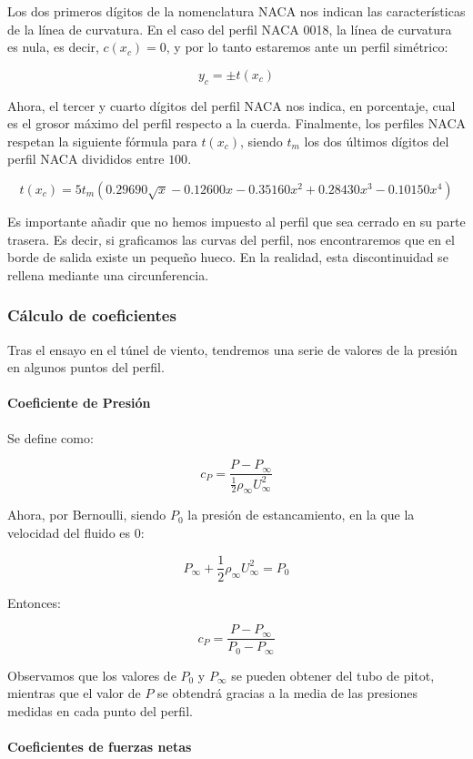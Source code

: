\documentclass{article}
\begin{document}
Los dos primeros dígitos de la nomenclatura NACA nos indican las características de la línea de curvatura. En el caso del perfil
NACA 0018, la línea de curvatura es nula, es decir, $c(x_c) = 0$, y por lo tanto estaremos ante un perfil simétrico:

$$y_c = \pm t(x_c)$$

Ahora, el tercer y cuarto dígitos del perfil NACA nos indica, en porcentaje, cual es el grosor máximo del perfil respecto
a la cuerda. Finalmente, los perfiles NACA respetan la siguiente fórmula para $t(x_c)$, siendo $t_m$ los
dos últimos dígitos del perfil NACA divididos entre $100$.

$$t(x_c) = 5 t_m (0.29690 \sqrt{x} - 0.12600 x - 0.35160 x^2 + 0.28430 x^3 - 0.10150 x^4)$$

Es importante añadir que no hemos impuesto al perfil que sea cerrado en su parte trasera. 
Es decir, si graficamos las curvas del perfil, nos encontraremos que en el borde de salida existe un pequeño hueco. 
En la realidad, esta discontinuidad se rellena mediante una circunferencia. \cite{Jacobs1932TheCO}

\subsubsection{Cálculo de coeficientes}

Tras el ensayo en el túnel de viento, tendremos una serie de valores de la presión en algunos puntos del perfil.

\paragraph{Coeficiente de Presión}

Se define como:

$$c_P = \frac{P - P_{\infty}}{\frac{1}{2}\rho_{\infty} U^2_{\infty}}$$

Ahora, por Bernoulli, siendo $P_0$ la presión de estancamiento, en la que la velocidad del fluido es 0:

$$P_{\infty} + \frac{1}{2} \rho_{\infty} U^2_{\infty} = P_0$$

Entonces:

$$c_P = \frac{P - P_{\infty}}{P_0 - P_{\infty}}$$

Observamos que los valores de $P_0$ y $P_{\infty}$ se pueden obtener del tubo de pitot, mientras que el valor de
$P$ se obtendrá gracias a la media de las presiones medidas en cada punto del perfil.

\paragraph{Coeficientes de fuerzas netas}
\end{document}
